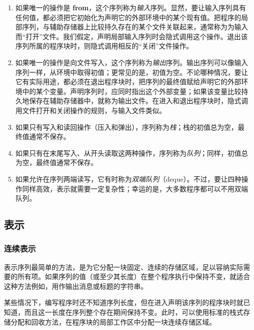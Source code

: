 \begin{enumerate}[wide, nosep, label=(\arabic*)]
	\item 如果唯一的操作是 \textbf{from}，这个序列称为\textit{输入}序列。显然，要让输入序列具有任何值，都必须把它初始化为声明它的外部环境中的某个现有值。把程序的局部序列，与辅助存储器上比较持久存在的某个文件关联起来，通常称为为输入而“打开”文件。我们假定，声明局部输入序列时会隐式调用这个操作。退出该序列所属的程序块时，则隐式调用相反的“关闭”文件操作。

	\item 如果唯一的操作是向文件写入，这个序列称为\textit{输出}序列。输出序列可以像输入序列一样，从环境中取得初值；更常见的是，初值为空。不论哪种情况，要让它有实际用途，都必须在退出程序块时，把序列的最终值赋给声明它的外部环境中的某个变量。声明序列时，应同时指出这个外部变量；如果该变量比较持久地保存在辅助存储器中，就称为输出文件。在进入和退出程序块时，隐式调用文件打开和关闭操作的规则，与输入文件类似。

	\item 如果只有写入和读回操作（压入和弹出），序列称为\textit{栈}；栈的初值总为空，最终值通常不保存。

	\item 如果只有在末尾写入、从开头读取这两种操作，序列称为\textit{队列}；同样，初值总为空，最终值通常不保存。

	\item 如果允许在序列两端读写，它有时称为\textit{双端队列}（deque）。不过，要让四种操作同样高效，表示就需要一定复杂性；幸运的是，大多数程序都可以不用双端队列。
\end{enumerate}

\subsection{表示}

\subsubsection{连续表示}

表示序列最简单的方法，是为它分配一块固定、连续的存储区域，足以容纳实际需要的所有项。如果序列的值（或至少其长度）在整个程序执行中保持不变，就适合这种方法\textemdash{}例如，用作输出消息或标题的字符串。

某些情况下，编写程序时还不知道序列长度，但在进入声明该序列的程序块时就已知道，而且这一长度在序列整个存在期间保持不变。此时，可以使用标准的栈式存储分配和回收方法，在程序块的局部工作区中分配一块连续存储区域。

